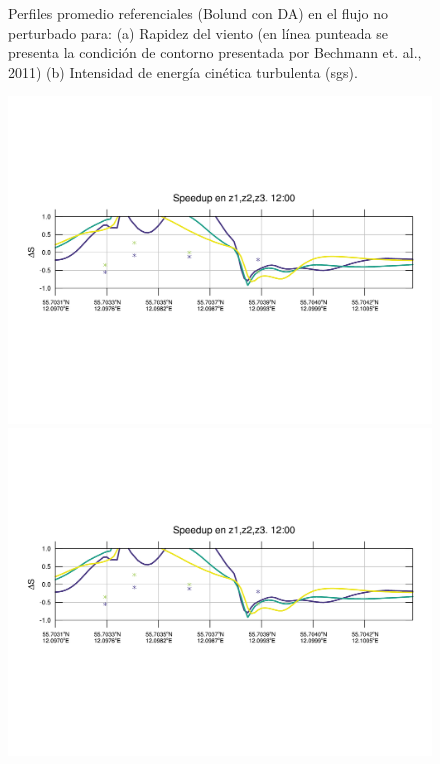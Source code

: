 \begin{figure}[H]
	\caption{Perfiles promedio referenciales (Bolund con DA) en el flujo no perturbado para: (a) Rapidez del viento (en línea punteada se presenta la condición de contorno presentada por Bechmann et. al., 2011) (b) Intensidad de energía cinética turbulenta (sgs).}
	\label{fig:06_bol_da_referencia}
\end{figure}

\begin{figure}[H]
	\centering
	\includegraphics[width=0.95\linewidth,trim={12mm 84mm 10mm 74mm},page=1,clip]{Imagenes/06/bol_da/speedup}\\%
	\includegraphics[width=0.95\linewidth,trim={12mm 84mm 10mm 74mm},page=13,clip]{Imagenes/06/bol_da/speedup}\\%

\end{figure}
